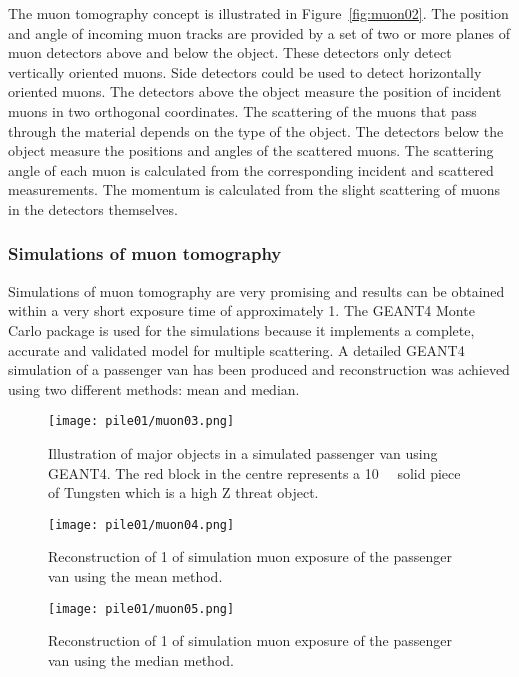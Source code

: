 \documentclass[twoside,titlepage,11pt,twocolumn,a4paper]{article}
\begin{document}
The muon tomography concept is illustrated in
Figure~\ref{fig:muon02}. The position and angle of incoming muon
tracks are provided by a set of two or more planes of muon detectors
above and below the object. These detectors only detect vertically
oriented muons. Side detectors could be used to detect horizontally
oriented muons. The detectors above the object measure the position of
incident muons in two orthogonal coordinates. The scattering of the
muons that pass through the material depends on the type of the
object. The detectors below the object measure the positions and
angles of the scattered muons. The scattering angle of each muon is
calculated from the corresponding incident and scattered
measurements. The momentum is calculated from the slight scattering of
muons in the detectors themselves. \citep{statisticalRec2007}

\subsubsection{Simulations of muon tomography}
Simulations of muon tomography are very promising and results can be
obtained within a very short exposure time of approximately
\unit{1}{\minute}. The GEANT4 Monte Carlo package is used for the
simulations because it implements a complete, accurate and validated
model for multiple scattering. A detailed GEANT4 simulation of a
passenger van has been produced and reconstruction was achieved using
two different methods: mean and median. \citep{statisticalRec2007}

\begin{figure}
  \texttt{[image: pile01/muon03.png]}
  \caption{Illustration of major objects in a simulated passenger van
    using GEANT4. The red block in the centre represents a
    \unit{10}{\cubic{\centi\metre}} solid piece of
    Tungsten which is a high Z threat
    object. \citep{statisticalRec2007}}
\end{figure}
\begin{figure}
  \texttt{[image: pile01/muon04.png]}
  \caption{Reconstruction of \unit{1}{\minute} of simulation muon
    exposure of the passenger van using the mean
    method. \citep{statisticalRec2007}}
  \label{fig:muon04}
\end{figure}
\begin{figure}
  \texttt{[image: pile01/muon05.png]}
  \caption{Reconstruction of \unit{1}{\minute} of simulation muon
    exposure of the passenger van using the median
    method. \citep{statisticalRec2007}}
  \label{fig:muon05}
\end{figure}
\end{document}
